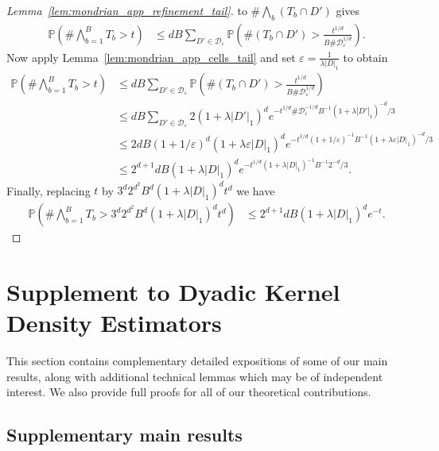 \documentclass[11pt,lof]{puthesis}
\renewcommand{\P}{\ensuremath{\mathbb{P}}}
\newcommand{\cD}{\ensuremath{\mathcal{D}}}
\theoremstyle{break}
\theoremstyle{proof}
\newtheorem{proof}{Proof}
\begin{document}
\begin{proof}[Lemma~\ref{lem:mondrian_app_refinement_tail}]
  to $\# \bigwedge_b (T_b \cap D')$ gives
  \begin{align*}
    \P\left(
      \# \bigwedge_{b=1}^B T_b
      > t
    \right)
    &\leq
    d B \sum_{D' \in \cD_\varepsilon}
    \P\left(
      \# (T_b \cap D')
      > \frac{t^{1/d}}{B \# \cD_\varepsilon^{1/d}}
    \right).
  \end{align*}
  Now apply Lemma~\ref{lem:mondrian_app_cells_tail}
  and set $\varepsilon = \frac{1}{\lambda |D|_1}$ to obtain
  \begin{align*}
    \P\left(
      \# \bigwedge_{b=1}^B T_b
      > t
    \right)
    &\leq
    d B \sum_{D' \in \cD_\varepsilon}
    \P\left(
      \# (T_b \cap D')
      > \frac{t^{1/d}}{B \# \cD_\varepsilon^{1/d}}
    \right) \\
    &\leq
    d B \sum_{D' \in \cD_\varepsilon}
    2 (1 + \lambda |D'|_1)^d
    e^{- t^{1/d} \# \cD_\varepsilon^{-1/d} B^{-1}
    (1 + \lambda |D'|_1)^{-d} / 3} \\
    &\leq
    2 d B (1 + 1 / \varepsilon)^d
    (1 + \lambda \varepsilon |D|_1)^d
    e^{- t^{1/d} (1 + 1/\varepsilon)^{-1} B^{-1}
    (1 + \lambda \varepsilon |D|_1)^{-d} / 3} \\
    &\leq
    2^{d+1} d B (1 + \lambda |D|_1)^d
    e^{- t^{1/d} (1 + \lambda |D|_1)^{-1} B^{-1} 2^{-d} / 3}.
  \end{align*}
  Finally, replacing $t$ by $3^d 2^{d^2} B^d (1+\lambda|D|_1)^d t^d$ we have
  \begin{align*}
    \P\left(
      \# \bigwedge_{b=1}^B T_b
      > 3^d 2^{d^2} B^d (1+\lambda|D|_1)^d t^d
    \right)
    &\leq
    2^{d+1} d B (1 + \lambda |D|_1)^d e^{-t}.
  \end{align*}
\end{proof}

\chapter{Supplement to Dyadic Kernel Density Estimators}
\label{app:kernel}

This section contains complementary detailed expositions of some
of our main results, along with additional technical lemmas
which may be of independent interest. We also provide full proofs
for all of our theoretical contributions.

\section{Supplementary main results}
\end{document}
